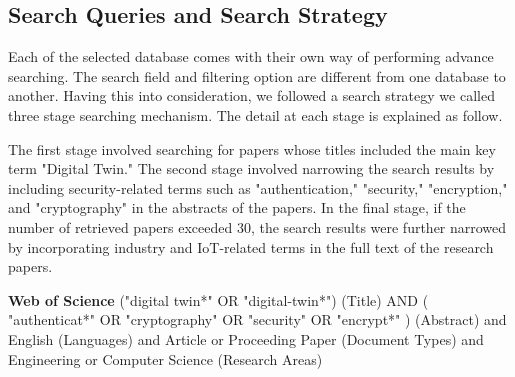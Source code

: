 \subsection{Search Queries and Search Strategy}

 Each of the selected database comes with their own way of performing advance searching. The search field and filtering option are different from one database to another. Having this into consideration, we followed a search strategy we called three stage searching mechanism. The detail at each stage is explained as follow. 

The first stage involved searching for papers whose titles included the main key term "Digital Twin." The second stage involved narrowing the search results by including security-related terms such as "authentication," "security," "encryption," and "cryptography" in the abstracts of the papers. In the final stage, if the number of retrieved papers exceeded 30, the search results were further narrowed by incorporating industry and IoT-related terms in the full text of the research papers. 

\begin{tcolorbox}[colback=black!5!white, sharp corners=all, colframe=white!95!black]
\textbf{Web of Science}
\tcblower
("digital twin*" OR "digital-twin*") (Title) AND ( "authenticat*" OR "cryptography" OR "security" OR "encrypt*" ) (Abstract) and English (Languages) and Article or Proceeding Paper (Document Types) and Engineering or Computer Science (Research Areas)
\end{tcolorbox}


